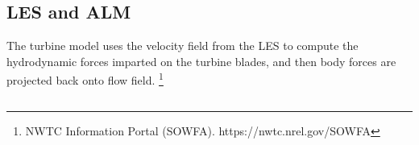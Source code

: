 \documentclass[xcolor=x11names,compress]{beamer}
\renewcommand{\(}{\begin{columns}}
\renewcommand{\)}{\end{columns}}
\newcommand{\<}[1]{\begin{column}{#1}}
\renewcommand{\>}{\end{column}}
\begin{document}
\subsection{LES and ALM}
\begin{frame}{}


\small The turbine model uses the 
velocity field from the LES to compute the 
hydrodynamic forces imparted on the turbine blades, and
then body forces are projected back onto flow field. 
\footnote{\tiny NWTC Information Portal (SOWFA). https://nwtc.nrel.gov/SOWFA}

\vspace{-5pt}

\begin{columns}
		    
    \begin{column}{0.3\textwidth}

\vspace{-10pt}


\end{column}
\end{columns}
\end{frame}
\end{document}
